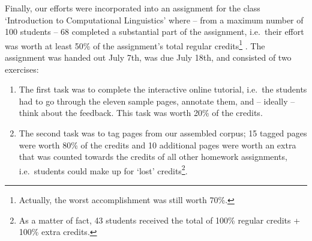 \documentclass[12pt,a4paper]{article}
\begin{document}
Finally, our efforts were incorporated into an assignment for the class `Introduction to Computational Linguistics' where -- from a maximum number of 100 students -- 68 completed a substantial part of the assignment, i.e.~their effort was worth at least 50\% of the assignment's total regular credits\footnote{Actually, the worst accomplishment was still worth 70\%.} .
The assignment was handed out July 7th, was due July 18th, and consisted of two exercises:
\begin{enumerate}
	\item The first task was to complete the interactive online tutorial, i.e.~the students had to go through the eleven sample pages, annotate them, and -- ideally -- think about the feedback. This task was worth 20\% of the credits.
	\item The second task was to tag pages from our assembled corpus; 15 tagged pages were worth 80\% of the credits and 10 additional pages were worth an extra that was counted towards the credits of all other homework assignments, i.e.~students could make up for `lost' credits\footnote{As a matter of fact, 43 students received the total of 100\% regular credits + 100\% extra credits.}.
\end{enumerate}



\end{document}
